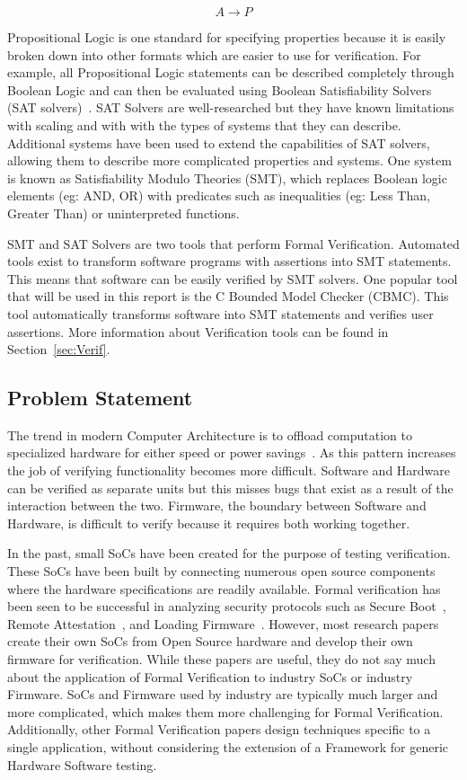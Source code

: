 \documentclass[../report.tex]{subfiles}
\begin{document}
\begin{equation}
    A \to P
\end{equation}

Propositional Logic is one standard for specifying properties because it is easily
broken down into other formats which are easier to use for verification.
For example, all Propositional Logic statements can be described completely
through Boolean Logic and can then be evaluated using Boolean Satisfiability
Solvers (SAT solvers)~\cite{validating-sat}. SAT Solvers are well-researched but
they have known limitations with scaling and with with the types of systems that
they can describe.
Additional systems have been used to extend the capabilities of SAT solvers, allowing them to describe more complicated properties and systems. 
One system is known as Satisfiability Modulo Theories (SMT), which replaces
Boolean logic elements (eg: AND, OR) with predicates such as inequalities (eg:
Less Than, Greater Than) or uninterpreted functions. 

SMT and SAT Solvers are two tools that perform Formal Verification. 
Automated tools exist to transform software programs with assertions into SMT statements.
This means that software can be easily verified by SMT solvers.
One popular tool that will be used in this report is the C Bounded Model Checker (CBMC). 
This tool automatically transforms software into SMT statements and verifies
user assertions.
More information about Verification tools can be found in
Section~\ref{sec:Verif}. 

\subsection{Problem Statement}

The trend in modern Computer Architecture is to offload computation to specialized hardware for either speed or power savings~\cite{hardware-accel}.
As this pattern increases the job of verifying functionality becomes more difficult.
Software and Hardware can be verified as separate units but this misses bugs
that exist as a result of the interaction between the two.
Firmware, the boundary between Software and Hardware, is difficult to verify 
because it requires both working together.

In the past, small SoCs have been created for the purpose of testing verification.
These SoCs have been built by connecting numerous open source components where the hardware specifications are readily available.
Formal verification has been seen to be successful in analyzing security
protocols such as Secure Boot~\cite{elane}, Remote
Attestation~\cite{trustfound}, and Loading Firmware~\cite{load-protocol}. 
However, most research papers create their own SoCs from Open Source hardware
and develop their own firmware for verification.
While these papers are useful, they do not say much about the application of
Formal Verification to industry SoCs or industry Firmware.
SoCs and Firmware used by industry are typically much larger and more
complicated, which makes them more challenging for Formal Verification.
Additionally, other Formal Verification papers design techniques specific to a
single application, without considering the extension of a Framework for
generic Hardware Software testing.
\end{document}

